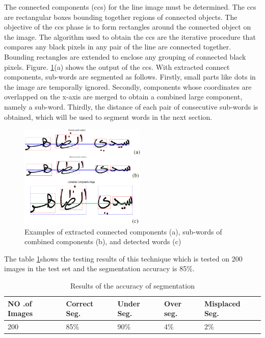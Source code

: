\begin{itemize}[labelindent=1em,labelsep=0.25cm,leftmargin=*]
The connected components (\acrshort{cc}s) for the line image must be determined.  The  \acrshort{cc}s  are  rectangular  boxes  bounding  together  regions of connected objects. The objective of the \acrshort{cc}s phase is to  form  rectangles  around  the  connected  object  on  the  image.    The algorithm used to obtain the \acrshort{cc}s  are  the  iterative procedure that compares any black pixels in any pair of the line are connected together.    Bounding rectangles are  extended  to  enclose  any  grouping  of  connected  black  pixels.  Figure. \ref{fig:ccs}(a) shows the output of the \acrshort{cc}s.  With extracted connect components,    sub-words are segmented  as  follows.  Firstly,  small  parts  like  dots  in  the  image  are  temporally  ignored.  Secondly,  components  whose  coordinates  are  overlapped  on  the x-axis  are  merged  to  obtain  a  combined  large  component,  namely  a sub-word.  Thirdly,  the  distance  of  each  pair  of  consecutive  sub-words  is  obtained,  which will be used to segment words in the next section.
\begin{figure}[!htb]
    \centering
    \includegraphics[width=6cm]{images/ccs.png}
    \caption{Examples of extracted connected components (a), sub-words of combined components (b), and detected words (c)}
    \label{fig:ccs}
\end{figure}




\end{itemize}

\noindent
The table \ref{tb:vpp-accuracy-table}shows the testing results of this technique which is tested on 200 images in the test set and the segmentation accuracy is  85\%.
    

\begin{table}[!htb]
\centering
\begin{tabular}{|l|l|l|l|l|}
\hline
 NO .of Images & Correct Seg. & Under Seg. & Over seg. & Misplaced Seg. \\ \hline
 200  & 85\%  & 90\% & 4\% & 2\% \\ \hline
\end{tabular}
\caption{Results of the accuracy of segmentation}
\label{tb:vpp-accuracy-table}
\end{table}

